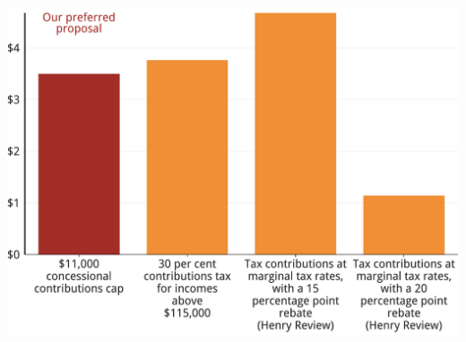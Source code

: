 \documentclass[tikz]{standalone}\usepackage[]{graphicx}\usepackage[]{color}
\newenvironment{knitrout}{}{} %
\begin{document}
\begin{knitrout}
\color{fgcolor}
\includegraphics[width=11.000in,height=8in]{./Super-tax-targeting/b5-super-atlas/Figure4-10-1} 

\end{knitrout}
\end{document}
